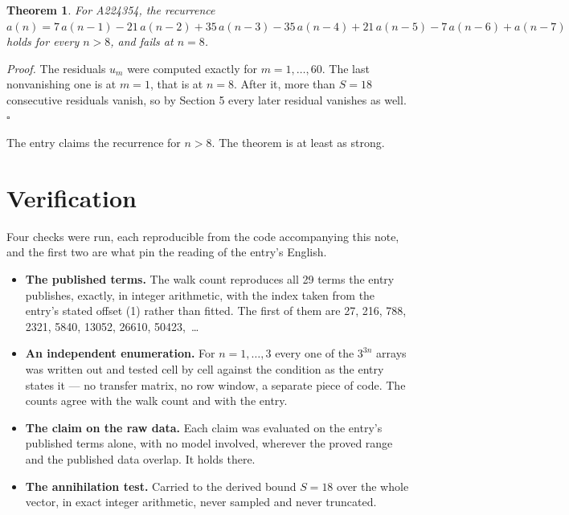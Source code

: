 \documentclass[11pt]{article}
\newtheorem{theorem}{Theorem}
\theoremstyle{definition}
\begin{document}
\begin{theorem} For A224354, the recurrence $a(n) = 7\,a(n-1) - 21\,a(n-2) + 35\,a(n-3) - 35\,a(n-4) + 21\,a(n-5) - 7\,a(n-6) + a(n-7)$ holds for every $n > 8$, and fails at $n = 8$.\end{theorem}

{\itshape Proof.} The residuals $u_m$ were computed exactly for $m = 1,\dots,60$. The last nonvanishing one is at $m = 1$, that is at $n = 8$. After it, more than $S = 18$ consecutive residuals vanish, so by Section 5 every later residual vanishes as well. $\square$

The entry claims the recurrence for $n > 8$. The theorem is at least as strong.

\section{Verification}

Four checks were run, each reproducible from the code accompanying this note, and the first two are what pin the reading of the entry's English.

\begin{itemize}

\item {\bfseries The published terms.} The walk count reproduces all 29 terms the entry publishes, exactly, in integer arithmetic, with the index taken from the entry's stated offset (1) rather than fitted. The first of them are 27, 216, 788, 2321, 5840, 13052, 26610, 50423,~\dots

\item {\bfseries An independent enumeration.} For $n = 1,\dots,3$ every one of the $3^{3n}$ arrays was written out and tested cell by cell against the condition as the entry states it --- no transfer matrix, no row window, a separate piece of code. The counts agree with the walk count and with the entry.

\item {\bfseries The claim on the raw data.} Each claim was evaluated on the entry's published terms alone, with no model involved, wherever the proved range and the published data overlap. It holds there.

\item {\bfseries The annihilation test.} Carried to the derived bound $S = 18$ over the whole vector, in exact integer arithmetic, never sampled and never truncated.

\end{itemize}
\end{document}
